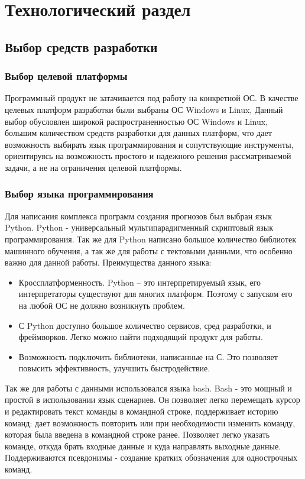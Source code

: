 \chapter{Технологический раздел}
\section{Выбор средств разработки}
\subsection{Выбор целевой платформы}
Программный продукт  не затачивается под работу на конкретной ОС. В качестве целевых платформ разработки были выбраны ОС Windows и Linux, Данный выбор обусловлен широкой распространенностью ОС Windows и Linux, большим количеством средств разработки для данных платформ, что дает возможность выбирать
язык программирования и сопутствующие инструменты, ориентируясь на возможность простого и надежного решения рассматриваемой
задачи, а не на ограничения целевой платформы.


\subsection{Выбор языка программирования}
Для написания комплекса программ создания прогнозов был выбран язык Python.
Python - универсальный мультипарадигменный скриптовый язык программирования. Так же для Python написано большое количество библиотек машинного обучения, а так же для работы с тектовыми данными, что особенно важно для данной работы.
Преимущества данного языка:
\begin{itemize}
	\item Кроссплатформенность. Python – это интерпретируемый язык, его интерпретаторы существуют для многих платформ. Поэтому с запуском его на любой ОС не должно возникнуть проблем.
	\item С Python доступно большое количество сервисов, сред разработки, и фреймворков. Легко можно найти подходящий продукт для работы.
	\item Возможность подключить библиотеки, написанные на С. Это позволяет повысить эффективность, улучшить быстродействие.
\end{itemize}



Так же для работы с данными использовался языка bash. Bash - это мощный и простой в использовании язык сценариев. Он позволяет 	 легко перемещать курсор и редактировать текст команды в командной строке, поддерживает историю команд: дает возможность повторить или при необходимости изменить команду, которая была введена в командной строке ранее. Позволяет легко указать команде, откуда брать входные данные и куда направлять выходные данные. Поддерживаются псевдонимы - создание кратких обозначения для однострочных команд.

